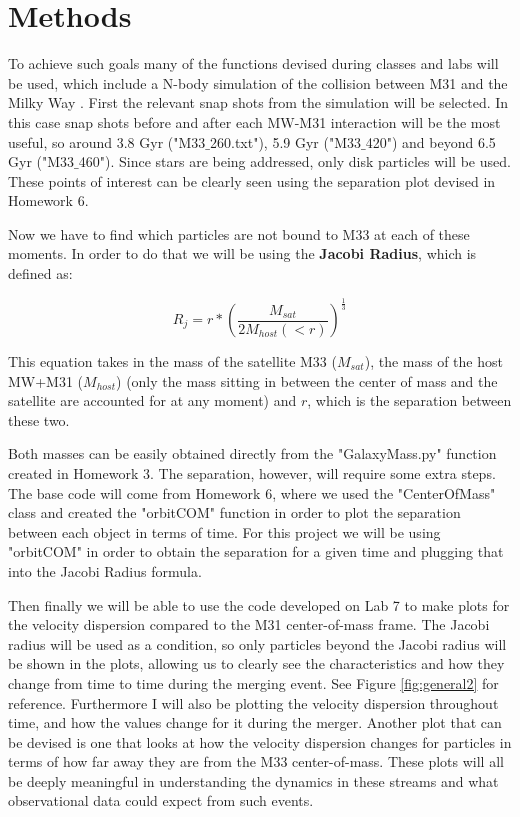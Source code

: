 \documentclass[linenumbers,trackchanges,twocolumn]{aastex7}
\begin{document}
\section{Methods} \label{sec:methods}

To achieve such goals many of the functions devised during classes and labs will be used, which include a N-body simulation of the collision between M31 and the Milky Way \citep{Van_der_Marel2012-bf}. First the relevant snap shots from the simulation will be selected. In this case snap shots before and after each MW-M31 interaction will be the most useful, so around 3.8 Gyr ("M33$\_$260.txt"), 5.9 Gyr ({"M33$\_$420"}) and beyond 6.5 Gyr ("M33$\_$460"). Since stars are being addressed, only disk particles will be used. These points of interest can be clearly seen using the separation plot devised in Homework 6.


Now we have to find which particles are not bound to M33 at each of these moments. In order to do that we will be using the \textbf{Jacobi Radius}, which is defined as:

\begin{equation}
    R_j = r*{(\frac{M_{sat}}{2M_{host}(<r)})}^{\frac{1}{3}}
\end{equation}

This equation takes in the mass of the satellite M33 ($M_{sat}$), the mass of the host MW+M31 ($M_{host}$) (only the mass sitting in between the center of mass and the satellite are accounted for at any moment) and $r$, which is the separation between these two.

Both masses can be easily obtained directly from the "GalaxyMass.py" function created in Homework 3. The separation, however, will require some extra steps. The base code will come from Homework 6, where we used the "CenterOfMass" class and created the "orbitCOM" function in order to plot the separation between each object in terms of time. For this project we will be using "orbitCOM" in order to obtain the separation for a given time and plugging that into the Jacobi Radius formula.

Then finally we will be able to use the code developed on Lab 7 to make plots for the velocity dispersion compared to the M31 center-of-mass frame. The Jacobi radius will be used as a condition, so only particles beyond the Jacobi radius will be shown in the plots, allowing us to clearly see the characteristics and how they change from time to time during the merging event. See Figure \ref{fig:general2} for reference. Furthermore I will also be plotting the velocity dispersion throughout time, and how the values change for it during the merger. Another plot that can be devised is one that looks at how the velocity dispersion changes for particles in terms of how far away they are from the M33 center-of-mass. These plots will all be deeply meaningful in understanding the dynamics in these streams and what observational data could expect from such events.
\end{document}

